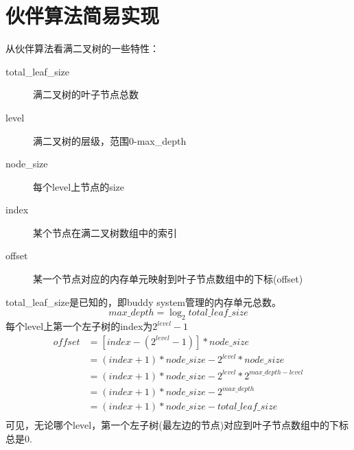 
\section[伙伴算法简易实现]{伙伴算法简易实现}
\begin{center}
  
\end{center}


从伙伴算法看满二叉树的一些特性：
\begin{description}
  \item[total\_leaf\_size] 满二叉树的叶子节点总数
  \item[level] 满二叉树的层级，范围0-max\_depth
  \item[node\_size] 每个level上节点的size
  \item[index] 某个节点在满二叉树数组中的索引
  \item[offset] 某一个节点对应的内存单元映射到叶子节点数组中的下标(offset)
\end{description}
total\_leaf\_size是已知的，即buddy system管理的内存单元总数。
$$ max\_depth = \log_2total\_leaf\_size$$
每个level上第一个左子树的index为$2^{level} - 1$
\begin{align*}
  offset & = [index - (2^{level} - 1)] * node\_size \\
         & = (index + 1) * node\_size - 2^{level} * node\_size \\
         & = (index + 1) * node\_size - 2^{level} * 2^{max\_depth - level} \\
         & = (index + 1) * node\_size - 2^{max\_depth} \\
         & = (index + 1) * node\_size - total\_leaf\_size \\
\end{align*}
可见，无论哪个level，第一个左子树(最左边的节点)对应到叶子节点数组中的下标总是0.